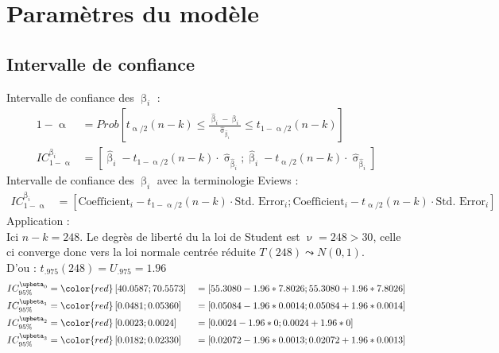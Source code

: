 \documentclass[A4paper]{article}
\begin{document}
\section{Paramètres du modèle}
\subsection{Intervalle de confiance} 
Intervalle de confiance des $\upbeta_i$ : 
\begin{equation*}
\begin{split}
		1-\upalpha &= Prob\left[ t_{\upalpha/2}(n-k) \le \frac{\hat{\upbeta}_i - \upbeta_i}{\hat{\upsigma}_{\hat{\upbeta}_i}} \le  t_{1-\upalpha/2}(n-k)\right] \\
		IC^{\upbeta_i}_{1-\upalpha} &= \left[ \hat{\upbeta}_i - t_{1-\upalpha/2}(n-k) \cdot \hat{\upsigma}_{\hat{\upbeta}_i}; \hat{\upbeta}_i - t_{\upalpha/2}(n-k) \cdot \hat{\upsigma}_{\hat{\upbeta}_i}\right]
\end{split}
\end{equation*}
Intervalle de confiance des $\upbeta_i$ avec la terminologie Eviews :
\begin{equation*}
\begin{split}
		IC^{\upbeta_i}_{1-\upalpha} &= \left[ \text{Coefficient}_i- t_{1-\upalpha/2}(n-k) \cdot \text{Std. Error}_i;\text{Coefficient}_i- t_{\upalpha/2}(n-k) \cdot \text{Std. Error}_i\right] 
\end{split}
\end{equation*}
Application : \\
Ici $n-k = 248$. Le degrès de liberté du la loi de Student est $\upnu = 248 > 30$, celle ci converge donc vers la loi normale centrée réduite $T(248) \leadsto N(0,1)$. \\
D'ou : $t_{.975}(248) =  U_{.975} = 1.96$ 
\begin{align*}
		IC^{\upbeta_0}_{95\%} &= {\color{red}\left[ 40.0587 ; 70.5573 \right]} & &= \left[ 55.3080 - 1.96* 7.8026 ; 55.3080 + 1.96* 7.8026 \right]\\
		IC^{\upbeta_1}_{95\%} &= {\color{red}\left[ 0.0481 ; 0.05360 \right]} & &= \left[ 0.05084 - 1.96 * 0.0014 ; 0.05084 + 1.96 * 0.0014\right]\\
		IC^{\upbeta_2}_{95\%} &= {\color{red}\left[ 0.0023 ; 0.0024 \right]} & &= \left[ 0.0024 - 1.96 * 0 ; 0.0024 + 1.96 * 0\right]\\
		IC^{\upbeta_3}_{95\%} &= {\color{red}\left[ 0.0182 ; 0.02330\right]} & &= \left[ 0.02072 - 1.96 * 0.0013;0.02072 + 1.96 * 0.0013\right]  
\end{align*}
\newpage
\end{document}

